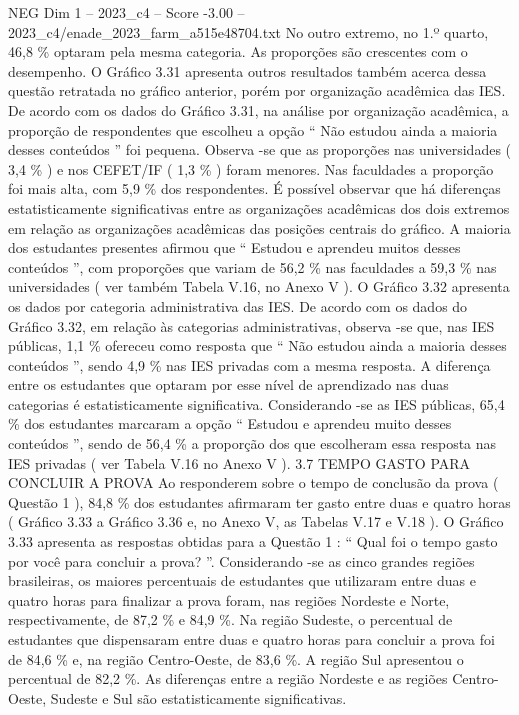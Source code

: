 \begin{textsample}{NEG Dim 1 – 2023\_c4 – Score -3.00 – 2023\_c4/enade\_2023\_farm\_a515e48704.txt}
No outro extremo, no 1.º quarto, 46,8 \% optaram pela mesma categoria.
As proporções são crescentes com o desempenho.
O Gráfico 3.31 apresenta outros resultados também acerca dessa questão retratada no gráfico anterior, porém por organização acadêmica das IES.
De acordo com os dados do Gráfico 3.31, na análise por organização acadêmica, a proporção de respondentes que escolheu a opção “ Não estudou ainda a maioria desses conteúdos ” foi pequena.
Observa -se que as proporções nas universidades ( 3,4 \% ) e nos CEFET/IF ( 1,3 \% ) foram menores.
Nas faculdades a proporção foi mais alta, com 5,9 \% dos respondentes.
É possível observar que há diferenças estatisticamente significativas entre as organizações acadêmicas dos dois extremos em relação as organizações acadêmicas das posições centrais do gráfico.
A maioria dos estudantes presentes afirmou que “ Estudou e aprendeu muitos desses conteúdos ”, com proporções que variam de 56,2 \% nas faculdades a 59,3 \% nas universidades ( ver também Tabela V.16, no Anexo V ).
O Gráfico 3.32 apresenta os dados por categoria administrativa das IES.
De acordo com os dados do Gráfico 3.32, em relação às categorias administrativas, observa -se que, nas IES públicas, 1,1 \% ofereceu como resposta que “ Não estudou ainda a maioria desses conteúdos ”, sendo 4,9 \% nas IES privadas com a mesma resposta.
A diferença entre os estudantes que optaram por esse nível de aprendizado nas duas categorias é estatisticamente significativa.
Considerando -se as IES públicas, 65,4 \% dos estudantes marcaram a opção “ Estudou e aprendeu muito desses conteúdos ”, sendo de 56,4 \% a proporção dos que escolheram essa resposta nas IES privadas ( ver Tabela V.16 no Anexo V ). 3.7 TEMPO GASTO PARA CONCLUIR A PROVA Ao responderem sobre o tempo de conclusão da prova ( Questão 1 ), 84,8 \% dos estudantes afirmaram ter gasto entre duas e quatro horas ( Gráfico 3.33 a Gráfico 3.36 e, no Anexo V, as Tabelas V.17 e V.18 ).
O Gráfico 3.33 apresenta as respostas obtidas para a Questão 1 : “ Qual foi o tempo gasto por você para concluir a prova? ”.
Considerando -se as cinco grandes regiões brasileiras, os maiores percentuais de estudantes que utilizaram entre duas e quatro horas para finalizar a prova foram, nas regiões Nordeste e Norte, respectivamente, de 87,2 \% e 84,9 \%.
Na região Sudeste, o percentual de estudantes que dispensaram entre duas e quatro horas para concluir a prova foi de 84,6 \% e, na região Centro-Oeste, de 83,6 \%.
A região Sul apresentou o percentual de 82,2 \%.
As diferenças entre a região Nordeste e as regiões Centro-Oeste, Sudeste e Sul são estatisticamente significativas.

\end{textsample}

